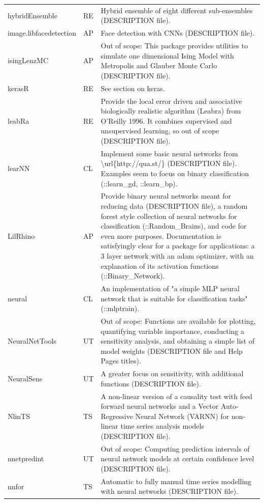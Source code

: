 \begin{Schunk}
\begin{longtable}[t]{ll>{\raggedright\arraybackslash}p{10cm}}
hybridEnsemble & RE & Hybrid ensemble of eight different sub-ensembles (DESCRIPTION file).\\
\addlinespace
image.libfacedetection & AP & Face detection with CNNs (DESCRIPTION file).\\
isingLenzMC & AP & Out of scope: This package provides utilities to simulate one dimensional Ising Model with Metropolis and Glauber Monte Carlo (DESCRIPTION file).\\
kerasR & RE & See section on keras.\\
leabRa & RE & Provide the local error driven and associative biologically realistic algorithm (Leabra) from O'Reilly 1996. It combines supervised and unsupervised learning, so out of scope (DESCRIPTION file).\\
learNN & CL & Implement some basic neural networks from \textbackslash{}url\{http://qua.st/\} (DESCRIPTION file). Examples seem to focus on binary classification (::learn\_gd, ::learn\_bp).\\
\addlinespace
LilRhino & AP & Provide binary neural networks meant for reducing data (DESCRIPTION file), a random forest style collection of neural networks for classification (::Random\_Brains), and code for even more purposes. Documentation is satisfyingly clear for a package for applications: a 3 layer network with an adam optimizer, with an explanation of its activation functions (::Binary\_Network).\\
neural & CL & An implementation of "a simple MLP neural network that is suitable for classification tasks" (::mlptrain).\\
NeuralNetTools & UT & Out of scope: Functions are available for plotting, quantifying variable importance, conducting a sensitivity analysis, and obtaining a simple list of model weights (DESCRIPTION file and Help Pages titles).\\
NeuralSens & UT & A greater focus on sensitivity, with additional functions (DESCRIPTION file).\\
NlinTS & TS & A non-linear version of a causality test with feed forward neural networks and a Vector Auto-Regressive Neural Network (VARNN) for non-linear time series analysis models (DESCRIPTION file).\\
\addlinespace
nnetpredint & UT & Out of scope: Computing prediction intervals of neural network models at certain confidence level (DESCRIPTION file).\\
nnfor & TS & Automatic to fully manual time series modelling with neural networks (DESCRIPTION file).\\

\end{longtable}
\end{Schunk}
